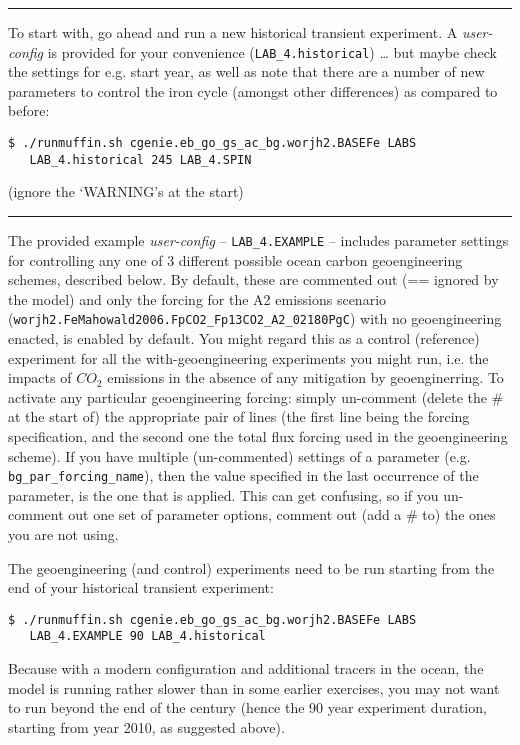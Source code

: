 \documentclass[11pt,fleqn]{book} %
\begin{document}
\vspace{1mm}
\noindent\rule{4cm}{0.1mm}
\vspace{2mm}

\noindent To start with, go ahead and run a new historical transient experiment. A \textit{user-config} is provided for your convenience (\texttt{LAB\_4.historical}) … but maybe check the settings for e.g. start year, as well as note that there are a number of new parameters to control the iron cycle (amongst other differences) as compared to before:
\vspace{-2pt}\begin{verbatim}
$ ./runmuffin.sh cgenie.eb_go_gs_ac_bg.worjh2.BASEFe LABS
   LAB_4.historical 245 LAB_4.SPIN
\end{verbatim}\vspace{-2pt}
(ignore the ‘WARNING’s at the start)

\vspace{1mm}
\noindent\rule{4cm}{0.1mm}
\vspace{2mm}

\noindent The provided example \textit{user-config} -- \texttt{LAB\_4.EXAMPLE} -- includes parameter settings for controlling any one of 3 different possible ocean carbon geoengineering schemes, described below. By default, these are commented out (== ignored by the model) and only the forcing for the A2 emissions scenario (\texttt{worjh2.FeMahowald2006.FpCO2\_Fp13CO2\_A2\_02180PgC}) with no geoengineering enacted,  is enabled by default. You might regard this as a control (reference) experiment for all the with-geoengineering experiments you might run, i.e. the impacts of \(CO_{2}\) emissions in the absence of any mitigation by geoenginerring. To activate any particular geoengineering forcing: simply un-comment (delete the \# at the start of) the appropriate pair of lines (the first line being the forcing specification, and the second one the total flux forcing used in the geoengineering scheme). If you have multiple (un-commented) settings of a parameter (e.g. \texttt{bg\_par\_forcing\_name}), then the value specified in the last occurrence of the parameter, is the one that is applied. This can get confusing, so if you un-comment out one set of parameter options, comment out (add a \# to) the ones you are not using.

The geoengineering (and control) experiments need to be run starting from the end of your historical transient experiment:
\vspace{-2pt}\begin{verbatim}
$ ./runmuffin.sh cgenie.eb_go_gs_ac_bg.worjh2.BASEFe LABS
   LAB_4.EXAMPLE 90 LAB_4.historical
\end{verbatim}\vspace{-2pt}
Because with a modern configuration and additional tracers in the ocean, the model is running rather slower than in some earlier exercises, you may not want to run beyond the end of the century (hence the 90 year experiment duration, starting from year 2010, as suggested above).
\end{document}
